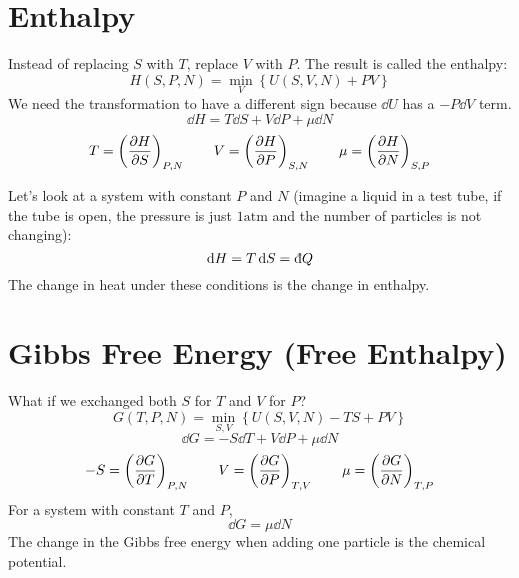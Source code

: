 \documentclass[a4paper,twoside,master.tex]{subfiles}
\begin{document}
\section{Enthalpy}
\label{sec:enthalpy}
Instead of replacing $ S $ with $ T $, replace $ V $ with $ P $. The result is called the enthalpy:
\begin{equation}\label{eq:enthalpy}
    H(S,P,N) = \min_V \left\{ U(S,V,N) + PV \right\}\tag{Enthalpy}
\end{equation}
We need the transformation to have a different sign because $ \dd{U} $ has a $ -P \dd{V} $ term.
\begin{equation}
    \dd{H} = T \dd{S} + V \dd{P} + \mu \dd{N}
\end{equation}
\begin{equation}
    T = \left( \pdv{H}{S} \right)_{P,N} \qquad V = \left( \pdv{H}{P} \right)_{S,N} \qquad \mu = \left( \pdv{H}{N} \right)_{S,P}
\end{equation}

Let's look at a system with constant $ P $ and $ N $ (imagine a liquid in a test tube, if the tube is open, the pressure is just $ 1\text{atm} $ and the number of particles is not changing):
\begin{equation}
    \dd{H} = T \dd{S} = \dbar{Q}
\end{equation}
The change in heat under these conditions is the change in enthalpy.

\section{Gibbs Free Energy (Free Enthalpy)}
\label{sec:gibbs_free_energy_(free_enthalpy)}

What if we exchanged both $ S $ for $ T $ and $ V $ for $ P $?
\begin{equation}\label{eq:gibbs_free_energy}
    G(T,P,N) = \min_{S,V} \left\{ U(S,V,N) - TS + PV \right\}\tag{Gibbs Free Energy}
\end{equation}
\begin{equation}
    \dd{G} = - S \dd{T} + V \dd{P} + \mu \dd{N}
\end{equation}
\begin{equation}
    -S = \left( \pdv{G}{T} \right)_{P,N} \qquad V = \left( \pdv{G}{P} \right)_{T,V} \qquad \mu = \left( \pdv{G}{N} \right)_{T,P}
\end{equation}
For a system with constant $ T $ and $ P $,
\begin{equation}
    \dd{G} = \mu \dd{N}
\end{equation}
The change in the Gibbs free energy when adding one particle is the chemical potential.
\end{document}
